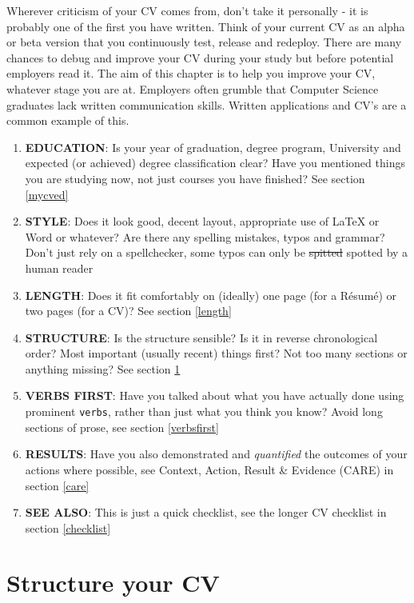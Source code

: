 \documentclass[
]{book}
\providecommand{\tightlist}{%
  \setlength{\itemsep}{0pt}\setlength{\parskip}{0pt}}
\begin{document}
Wherever criticism of your CV comes from, don't take it personally - it is probably one of the first you have written. Think of your current CV as an alpha or beta version that you continuously test, release and redeploy. There are many chances to debug and improve your CV during your study but before potential employers read it. The aim of this chapter is to help you improve your CV, whatever stage you are at. Employers often grumble that Computer Science graduates lack written communication skills. Written applications and CV's are a common example of this.

\begin{enumerate}
\def\labelenumi{\arabic{enumi}.}
\tightlist
\item
  \textbf{EDUCATION}: Is your year of graduation, degree program, University and expected (or achieved) degree classification clear? Have you mentioned things you are studying now, not just courses you have finished? See section \ref{mycved}
\item
  \textbf{STYLE}: Does it look good, decent layout, appropriate use of LaTeX or Word or whatever? Are there any spelling mistakes, typos and grammar? Don't just rely on a spellchecker, some typos can only be \sout{spitted} spotted by a human reader
\item
  \textbf{LENGTH}: Does it fit comfortably on (ideally) one page (for a Résumé) or two pages (for a CV)? See section \ref{length}
\item
  \textbf{STRUCTURE}: Is the structure sensible? Is it in reverse chronological order? Most important (usually recent) things first? Not too many sections or anything missing? See section \ref{mycvst}
\item
  \textbf{VERBS FIRST}: Have you talked about what you have actually done using prominent \texttt{verbs}, rather than just what you think you know? Avoid long sections of prose, see section \ref{verbsfirst}
\item
  \textbf{RESULTS}: Have you also demonstrated and \emph{quantified} the outcomes of your actions where possible, see Context, Action, Result \& Evidence (CARE) in section \ref{care}
\item
  \textbf{SEE ALSO}: This is just a quick checklist, see the longer CV checklist in section \ref{checklist}
\end{enumerate}

\hypertarget{mycvst}{%
\section{Structure your CV}\label{mycvst}}
\end{document}
